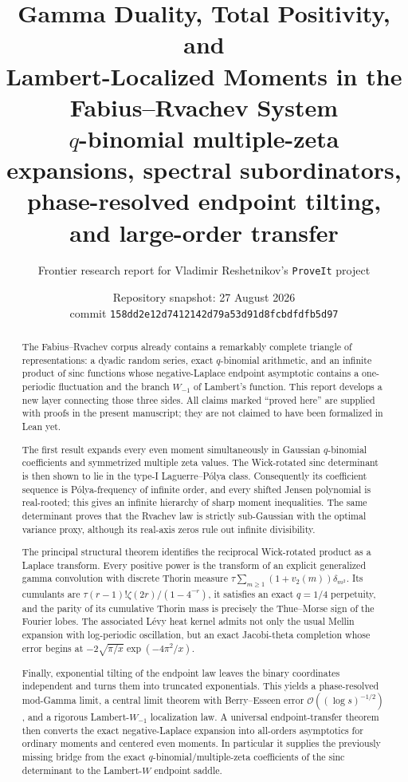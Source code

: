 \documentclass[11pt,oneside]{article}
\title{\bfseries Gamma Duality, Total Positivity, and\\
Lambert-Localized Moments in the Fabius--Rvachev System\\[0.45em]
\large $q$-binomial multiple-zeta expansions, spectral subordinators,\\
phase-resolved endpoint tilting, and large-order transfer}
\author{Frontier research report for Vladimir Reshetnikov's \texttt{ProveIt} project}
\date{Repository snapshot: 27 August 2026\\
\small commit \nolinkurl{158dd2e12d7412142d79a53d91d8fcbdfdfb5d97}}
\theoremstyle{definition}
\theoremstyle{remark}
\newcommand{\bigO}{\mathcal O}
\begin{document}
\maketitle

\begin{abstract}
The Fabius--Rvachev corpus already contains a remarkably complete triangle of
representations: a dyadic random series, exact $q$-binomial arithmetic, and an
infinite product of sinc functions whose negative-Laplace endpoint asymptotic
contains a one-periodic fluctuation and the branch $W_{-1}$ of Lambert's
function.  This report develops a new layer connecting those three sides.
All claims marked ``proved here'' are supplied with proofs in the present
manuscript; they are not claimed to have been formalized in Lean yet.

The first result expands every even moment simultaneously in Gaussian
$q$-binomial coefficients and symmetrized multiple zeta values.  The Wick-rotated
sinc determinant is then shown to lie in the type-I Laguerre--P\'olya class.
Consequently its coefficient sequence is P\'olya-frequency of infinite order,
and every shifted Jensen polynomial is real-rooted; this gives an infinite
hierarchy of sharp moment inequalities.  The same determinant proves that the
Rvachev law is strictly sub-Gaussian with the optimal variance proxy, although
its real-axis zeros rule out infinite divisibility.

The principal structural theorem identifies the reciprocal Wick-rotated
product as a Laplace transform.  Every positive power is the transform of an
explicit generalized gamma convolution with discrete Thorin measure
$\tau\sum_{m\ge1}(1+v_2(m))\delta_{m^2}$.  Its cumulants are
$\tau(r-1)!\zeta(2r)/(1-4^{-r})$, it satisfies an exact $q=1/4$ perpetuity, and
the parity of its cumulative Thorin mass is precisely the Thue--Morse sign of
the Fourier lobes.  The associated L\'evy heat kernel admits not only the usual
Mellin expansion with log-periodic oscillation, but an exact Jacobi-theta
completion whose error begins at
$-2\sqrt{\pi/x}\exp(-4\pi^2/x)$.

Finally, exponential tilting of the endpoint law leaves the binary coordinates
independent and turns them into truncated exponentials.  This yields a
phase-resolved mod-Gamma limit, a central limit theorem with Berry--Esseen error
$\bigO((\log s)^{-1/2})$, and a rigorous Lambert-$W_{-1}$ localization law.  A
universal endpoint-transfer theorem then converts the exact negative-Laplace
expansion into all-orders asymptotics for ordinary moments and centered even
moments.  In particular it supplies the previously missing bridge from the
exact $q$-binomial/multiple-zeta coefficients of the sinc determinant to the
Lambert-$W$ endpoint saddle.
\end{abstract}
\end{document}
